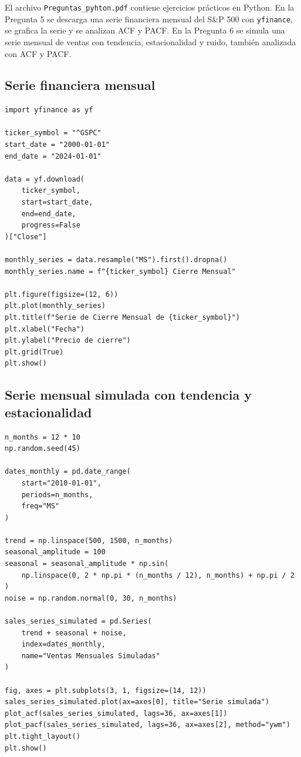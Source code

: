 \documentclass[12pt,a4paper]{article}
\begin{document}
\begin{markdowncell}
El archivo \texttt{Preguntas\_pyhton.pdf} contiene ejercicios prácticos en Python. En la Pregunta 5 se descarga una serie financiera mensual del S\&P 500 con \texttt{yfinance}, se grafica la serie y se analizan ACF y PACF. En la Pregunta 6 se simula una serie mensual de ventas con tendencia, estacionalidad y ruido, también analizada con ACF y PACF.
\end{markdowncell}

\subsection{Serie financiera mensual}

\begin{lstlisting}[style=pythonstyle]
import yfinance as yf

ticker_symbol = "^GSPC"
start_date = "2000-01-01"
end_date = "2024-01-01"

data = yf.download(
    ticker_symbol,
    start=start_date,
    end=end_date,
    progress=False
)["Close"]

monthly_series = data.resample("MS").first().dropna()
monthly_series.name = f"{ticker_symbol} Cierre Mensual"

plt.figure(figsize=(12, 6))
plt.plot(monthly_series)
plt.title(f"Serie de Cierre Mensual de {ticker_symbol}")
plt.xlabel("Fecha")
plt.ylabel("Precio de cierre")
plt.grid(True)
plt.show()
\end{lstlisting}

\subsection{Serie mensual simulada con tendencia y estacionalidad}

\begin{lstlisting}[style=pythonstyle]
n_months = 12 * 10
np.random.seed(45)

dates_monthly = pd.date_range(
    start="2010-01-01",
    periods=n_months,
    freq="MS"
)

trend = np.linspace(500, 1500, n_months)
seasonal_amplitude = 100
seasonal = seasonal_amplitude * np.sin(
    np.linspace(0, 2 * np.pi * (n_months / 12), n_months) + np.pi / 2
)
noise = np.random.normal(0, 30, n_months)

sales_series_simulated = pd.Series(
    trend + seasonal + noise,
    index=dates_monthly,
    name="Ventas Mensuales Simuladas"
)

fig, axes = plt.subplots(3, 1, figsize=(14, 12))
sales_series_simulated.plot(ax=axes[0], title="Serie simulada")
plot_acf(sales_series_simulated, lags=36, ax=axes[1])
plot_pacf(sales_series_simulated, lags=36, ax=axes[2], method="ywm")
plt.tight_layout()
plt.show()
\end{lstlisting}
\end{document}
